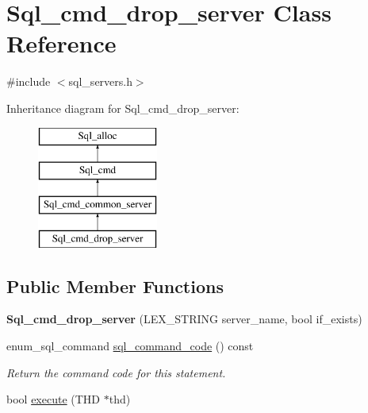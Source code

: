 \hypertarget{classSql__cmd__drop__server}{}\section{Sql\+\_\+cmd\+\_\+drop\+\_\+server Class Reference}
\label{classSql__cmd__drop__server}


{\ttfamily \#include $<$sql\+\_\+servers.\+h$>$}

Inheritance diagram for Sql\+\_\+cmd\+\_\+drop\+\_\+server\+:\begin{figure}[H]
\begin{center}
\leavevmode
\includegraphics[height=4.000000cm]{classSql__cmd__drop__server}
\end{center}
\end{figure}
\subsection*{Public Member Functions}
\begin{DoxyCompactItemize}
\item 
\mbox{\label{classSql__cmd__drop__server_a865cebcca1e426db88c4cbe7f78d555a}} 
{\bfseries Sql\+\_\+cmd\+\_\+drop\+\_\+server} (L\+E\+X\+\_\+\+S\+T\+R\+I\+NG server\+\_\+name, bool if\+\_\+exists)
\item 
\mbox{\label{classSql__cmd__drop__server_a1563a8181a1eefd88e85f76366b80c4b}} 
enum\+\_\+sql\+\_\+command \mbox{\hyperlink{classSql__cmd__drop__server_a1563a8181a1eefd88e85f76366b80c4b}{sql\+\_\+command\+\_\+code}} () const
\begin{DoxyCompactList}\small\item\em Return the command code for this statement. \end{DoxyCompactList}\item 
bool \mbox{\hyperlink{classSql__cmd__drop__server_a19ff682e57c46d10212a552e97806270}{execute}} (T\+HD $\ast$thd)
\end{DoxyCompactItemize}
